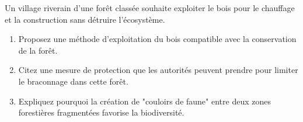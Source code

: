 \documentclass[11pt]{article}
\begin{document}
\begin{exercice}
Un village riverain d'une forêt classée souhaite exploiter le bois pour le chauffage et la construction sans détruire l'écosystème.
\begin{enumerate}
    \item Proposez une méthode d'exploitation du bois compatible avec la conservation de la forêt.
    \item Citez une mesure de protection que les autorités peuvent prendre pour limiter le braconnage dans cette forêt.
    \item Expliquez pourquoi la création de "couloirs de faune" entre deux zones forestières fragmentées favorise la biodiversité.
\end{enumerate}
\end{exercice}
\end{document}
